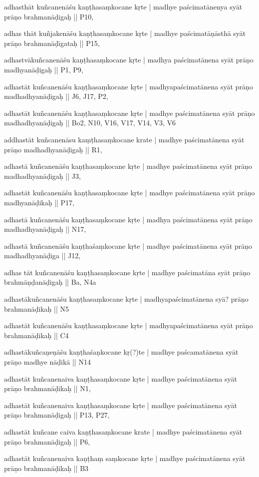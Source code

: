 \begin{marma}[hp02_009]
\begin{marma}[hp02_011]
\begin{marma}[hp02_46]
\item[adhasthāt kuñcanenāśu kaṇṭhasaṃkocane kṛte | madhye paścimatānenya syāt prāṇo brahmanāḍigaḥ ||] P10,
\item[adhas thāt kuñjakenāśu kaṇṭhasaṃkocane kṛte | madhye paścimatāṇāsthā syāt prāṇo brahmanāḍīgataḥ ||] P15, 
\item[adhastvākuñcanenāśu kaṇṭhasaṃkocane kṛte | madhya paścimatānena syāt prāṇo madhyanāḍigaḥ ||] P1, P9, 
\item[adhastāt kuñcanenāśu kaṇṭhasaṃkocane kṛte | madhyapaścimatānena syāt prāṇo madhadhyanāḍigaḥ ||] J6, J17, P2,
\item[adhastāt kuñcanenāśu kaṇṭhasaṃkocane kṛte | madhye paścimatānena syāt prāṇo madhadhyanāḍigaḥ ||] Bo2, N10, V16, V17, V14, V3, V6
\item[addhastāt kuñcanenāsu kaṃṭhasaṃkocane krate | madhye paścimatānena syāt prāṇo madhadhyanāḍigaḥ ||] R1, 
\item[adhastā kuñcanenāśu kaṇṭhasaṃkocane kṛte | madhye paścimatānena syāt prāṇo madhadhyanāḍigaḥ ||] J3,
\item[adhastāt kuñcanenāśu kaṇṭhasaṃkocane kṛte | madhye paścimatānena syāt prāṇo madhyanāḍikaḥ ||] P17, 
\item[adhastā kuñcanenāśu kaṇṭhasaṃkocane kṛte | madhya paścimatānena syāt prāṇo madhadhyanāḍigaḥ ||] N17,
\item[adhastā kuñcanenāśu kaṇṭhaśaṃkocane kṛte | madhye paścimatānena syāt prāṇo madhadhyanāḍiga ||] J12,
\item[adhas tāt kuñcanenāśu kaṇṭhasaṃkocane kṛte | madhye paścimatāna syāt prāṇo brahmāṇḍanāḍigaḥ ||]  Ba, N4a
\item[adhastākuñcanenāśu kaṇṭhasaṃkocane kṛte | madhyapaścimatānena syā? prāṇo brahmanāḍikaḥ ||]  N5
\item[adhastāt kuñcanenāśu kaṇṭhasaṃkocane kṛte | madhyapaścimatānena syāt prāṇo brahmanāḍikaḥ ||] C4
\item[adhastākuñcaṇeṇāśu kaṇṭhaśaṇkocane kṛ(?)te | madhye paścamatānena syāt prāṇo madhye nāḍikā ||] N14
\item[adhastāt kuñcanenaiva kaṇṭhasaṃkocane kṛte | madhye paścimatānena syāt prāṇo brahmanāḍikaḥ ||] N1,
\item[adhastāt kuñcanenaiva kaṇṭhasaṃkocane kṛte | madhye paścimatānena syāt prāṇo brahmanāḍigaḥ ||] P13, P27, 
\item[adhastāt kuñcane caiva kaṇṭhasaṃkocane krate | madhye paścimatānena syāt prāṇo brahmanāḍigaḥ ||] P6,
\item[adhastāt kuñcanenaiva kaṇṭhaṃ saṃkocane kṛte | madhye paścimatānena syāt prāṇo brahmanāḍikaḥ ||] B3

\end{marma}
\end{marma}
\end{marma}

